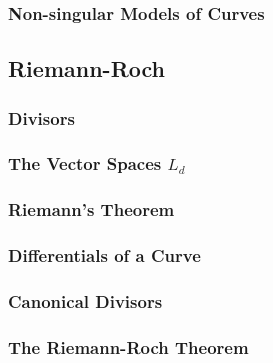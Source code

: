     \subsubsection{Non-singular Models of Curves}
    \subsection{Riemann-Roch}
    \subsubsection{Divisors}
    \subsubsection{The Vector Spaces $L_d$}
    \subsubsection{Riemann's Theorem}
    \subsubsection{Differentials of a Curve}
    \subsubsection{Canonical Divisors}
    \subsubsection{The Riemann-Roch Theorem}

